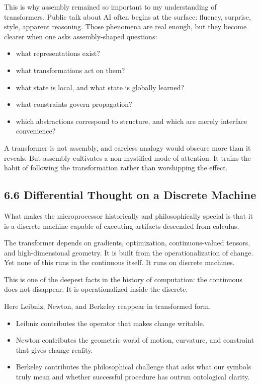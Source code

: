 \documentclass[
]{article}
\providecommand{\tightlist}{%
  \setlength{\itemsep}{0pt}\setlength{\parskip}{0pt}}
\begin{document}
This is why assembly remained so important to my understanding of
transformers. Public talk about AI often begins at the surface: fluency,
surprise, style, apparent reasoning. Those phenomena are real enough,
but they become clearer when one asks assembly-shaped questions:

\begin{itemize}
\tightlist
\item
  what representations exist?
\item
  what transformations act on them?
\item
  what state is local, and what state is globally learned?
\item
  what constraints govern propagation?
\item
  which abstractions correspond to structure, and which are merely
  interface convenience?
\end{itemize}

A transformer is not assembly, and careless analogy would obscure more
than it reveals. But assembly cultivates a non-mystified mode of
attention. It trains the habit of following the transformation rather
than worshipping the effect.

\hypertarget{differential-thought-on-a-discrete-machine}{%
\subsection{6.6 Differential Thought on a Discrete
Machine}\label{differential-thought-on-a-discrete-machine}}

What makes the microprocessor historically and philosophically special
is that it is a discrete machine capable of executing artifacts
descended from calculus.

The transformer depends on gradients, optimization, continuous-valued
tensors, and high-dimensional geometry. It is built from the
operationalization of change. Yet none of this runs in the continuous
itself. It runs on discrete machines.

This is one of the deepest facts in the history of computation: the
continuous does not disappear. It is operationalized inside the
discrete.

Here Leibniz, Newton, and Berkeley reappear in transformed form.

\begin{itemize}
\tightlist
\item
  Leibniz contributes the operator that makes change writable.
\item
  Newton contributes the geometric world of motion, curvature, and
  constraint that gives change reality.
\item
  Berkeley contributes the philosophical challenge that asks what our
  symbols truly mean and whether successful procedure has outrun
  ontological clarity.
\end{itemize}
\end{document}
